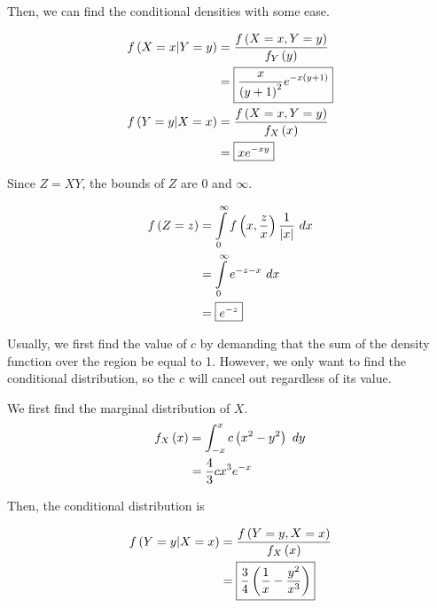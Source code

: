\documentclass{article}
\begin{document}
Then,
we can find the conditional densities with some ease.

\begin{align*}
  f \left (X = x \vert Y = y \right) &= \frac{f \left (X = x, Y = y \right)}{f_Y \left (y \right)} \\
                             &= \boxed{\frac{x}{\left (y+1 \right)^2} e^{-x \left (y+1 \right)}} \\
  f \left (Y = y \vert X = x \right) &= \frac{f \left (X = x, Y = y \right)}{f_X \left (x \right)} \\
                             &= \boxed{xe^{-xy}} \\
\end{align*}

\subproblema{}
Since $Z = XY$, the bounds of $Z$ are $0$ and $\infty$.


\begin{align*}
  f \left (Z = z \right) &= \int \limits_{0}^{\infty} f \left (x, \frac{z}{x} \right) \frac{1}{\left\lvert x \right\rvert}\ dx \\
                 &= \int \limits_{0}^{\infty} e^{-z - x}\ dx \\
                 &= \boxed{e^{-z}} \\
\end{align*}

\problem{}
Usually,
we first find the value of $c$ by demanding that the sum of the density function over the region be equal to 1.
However,
we only want to find the conditional distribution,
so the $c$ will cancel out regardless of its value.

We first find the marginal distribution of $X$.
\begin{align*}
  f_X \left (x \right) &= \int_{-x}^{x} c \left (x^2 - y^2 \right)\ dy \\
               &= \frac{4}{3} c x^3 e^{-x} \\
\end{align*}

Then,
the conditional distribution is

\begin{align*}
  f \left (Y = y \vert X = x \right) &= \frac{f \left (Y = y, X = x \right)}{f_X \left (x \right)} \\
                             &= \boxed{\frac{3}{4} \left (\frac{1}{x} - \frac{y^2}{x^3} \right)} \\
\end{align*}
\end{document}
